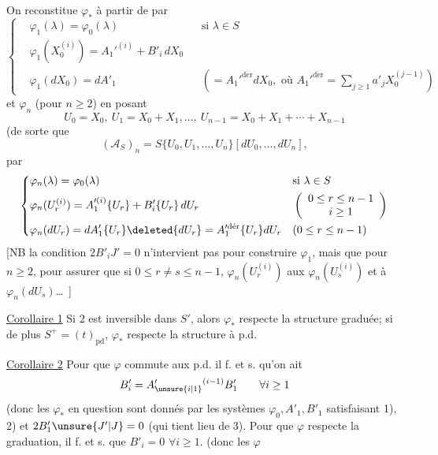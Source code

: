 On reconstitue $\varphi_*$ à partir de
par
\[
 \left\{\begin{aligned}
 &\varphi_1(\lambda)=\varphi_0(\lambda)&&\text{si }\lambda\in S\\
 &\varphi_1(X_0^{(i)})=A_1'^{(i)}+B'_i\,dX_0\\
 &\varphi_1(dX_0)=dA'_1&&\left(=A_1'^{\mathrm{d\acute er}}dX_0,\text{ où }A_1'^{\mathrm{d\acute er}}=\sum_{j\geq1}a'_jX_0^{(j-1)}\right)
 \end{aligned}\right.
\]
et $\varphi_n$ (pour $n\geq2$) en posant
\[
 U_0=X_0,\ U_1=X_0+X_1,\ldots,\ U_{n-1}=X_0+X_1+\cdots+X_{n-1}
\]
(de sorte que
\[
 (\mathcal A_S)_n=S\{U_0,U_1,\ldots,U_n\}[dU_0,\ldots,dU_n],
\]
par
\[
 \left\{\begin{aligned}
 &\varphi_n(\lambda)=\varphi_0(\lambda)&&\text{si }\lambda\in S\\
 &\varphi_n(U_r^{(i)})=A_1'^{(i)}\{U_r\}+B'_i\{U_r\}\,dU_r
 &&\left(\begin{array}{c}0\leq r\leq n-1\\i\geq1\end{array}\right)\\
 &\varphi_n(dU_r)=dA'_1\{U_r\}\deleted{dU_r}=A_1'^{\mathrm{d\acute er}}\{U_r\}dU_r
 &&(0\leq r\leq n-1)
 \end{aligned}\right.
\]
[NB la condition $2B'_iJ'=0$ n'intervient pas pour construire $\varphi_1$, mais que pour $n\geq2$, pour assurer que si $0\leq r\ne s\leq n-1$, $\varphi_n(U_r^{(i)})$   aux $\varphi_n(U_s^{(i)})$ et à $\varphi_n(dU_s)$\ldots\ ]

\uline{Corollaire 1} Si $2$ est inversible dans $S'$, alors $\varphi_*$ respecte la structure graduée; si de plus $S^+=(t)_{\mathrm{pd}}$, $\varphi_*$ respecte la structure à p.d.

\uline{Corollaire 2}  Pour que $\varphi$ commute aux p.d. il f. et s. qu'on ait
\[
 B'_i=A'_{\unsure{i|1}}{}^{(i-1)}B'_1\qquad\forall i\geq1
\]
(donc les $\varphi_*$ en question sont donnés par les systèmes $\varphi_0,A'_1,B'_1$ satisfaisant 1), 2) et $2B'_1\unsure{J'|J}=0$ (qui tient lieu de 3).
Pour que $\varphi$ respecte la graduation, il f. et s. que $B'_i=0$ $\forall i\geq1$. (donc les $\varphi$

